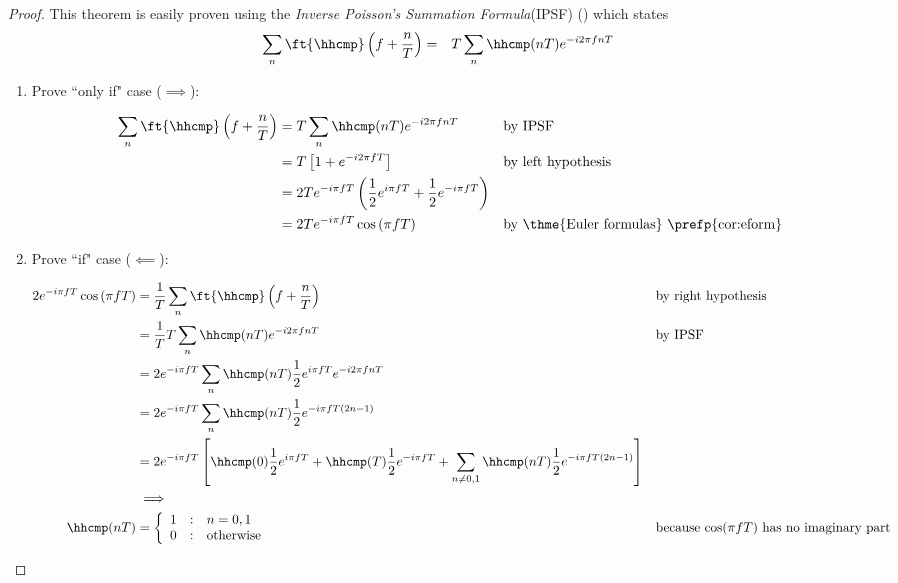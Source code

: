 \begin{proof}
This theorem is easily proven using the
{\em Inverse Poisson's Summation Formula}(IPSF)
()
which states
\begin{eqnarray*}
   \sum_n \ft{\hhcmp}\left( f+ \frac{n}{T} \right)
      &=& T \sum_n \hhcmp(nT) e^{-i2\pi fnT}
\end{eqnarray*}

\begin{enumerate}
\item Prove ``only if" case ($\implies$):

\begin{align*}
  \sum_n \ft{\hhcmp}\left( f + \frac{n}{T} \right)
    &= T\sum_n \hhcmp(nT) e^{-i2\pi fnT}
    && \text{by IPSF}
  \\&= T\left[1 + e^{-i2\pi fT}\right]
    && \text{by left hypothesis}
  \\&= 2Te^{-i\pi fT}\left( \frac{1}{2}e^{i\pi fT} + \frac{1}{2}e^{-i\pi fT}  \right)
  \\&= 2Te^{-i\pi fT}\cos\left(\pi fT\right)
    && \text{by \thme{Euler formulas} \prefp{cor:eform}}
\end{align*}


\item Prove ``if" case ($\impliedby$):

\begin{align*}
     2e^{-i\pi fT}\cos\left(\pi fT\right)
       &=  \frac{1}{T}\sum_n \ft{\hhcmp}\left( f+\frac{n}{T} \right)
       && \text{by right hypothesis}
     \\&= \frac{1}{T}T \sum_n \hhcmp(nT) e^{-i2\pi fnT}
       && \text{by IPSF}
     \\&= 2e^{-i\pi fT} \sum_n \hhcmp(nT) \frac{1}{2}e^{i\pi fT}e^{-i2\pi fnT}
     \\&= 2e^{-i\pi fT} \sum_n \hhcmp(nT) \frac{1}{2}e^{-i\pi fT(2n-1)}
     \\&= 2e^{-i\pi fT}
             \left[
               \hhcmp(0) \frac{1}{2}e^{i\pi fT} +
               \hhcmp(T) \frac{1}{2}e^{-i\pi fT} +
               \sum_{n\ne 0,1} \hhcmp(nT) \frac{1}{2}e^{-i\pi fT(2n-1)}
             \right]
     \\&\implies
\\
   \hhcmp(nT)
     &= \left\{\begin{array}{lcl}
           1 & : & n=0,1    \\
           0 & : & \text{otherwise}
        \end{array}\right.
       && \text{because $\cos(\pi fT)$ has no imaginary part}
\end{align*}
\end{enumerate}
\end{proof}

